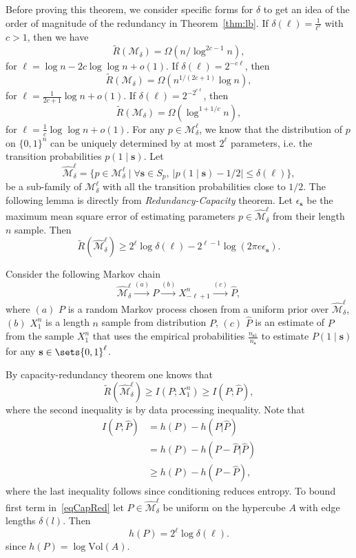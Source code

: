 \documentclass[conference,a4paper]{article}
\newcommand{\s}{\textbf{s}}
\newcommand{\M}{\mathcal{M}}
\newcommand{\hatp}{\hat{P}}
\begin{document}
Before proving this theorem, we consider specific forms for $\delta$
to get an idea of the order of magnitude of the redundancy in Theorem~\ref{thm:lb}.
\bCorollary
If $\delta(\ell)=\frac{1}{\ell^c}$ with $c>1$, then we have
\[
\tilde{R}(\M_{\delta})=\Omega(n/\log^{2c-1}n),
\]
for $\ell=\log n-2c\log\log n+o(1)$.
If $\delta(\ell)=2^{-c\ell}$, then
\[
\tilde{R}(\M_{\delta})=\Omega(n^{1/(2c+1)}\log n),
\]
for $\ell=\frac{1}{2c+1}\log n+o(1)$. 
If $\delta(\ell)=2^{-2^{c\ell}}$, then
\[
\tilde{R}(\M_{\delta})=\Omega(\log^{1+1/c}n),
\]for $\ell = \frac{1}{c}\log \log n+o(1)$.
\eCorollary
For any $p\in \M_{\delta}^{\ell}$, we know that the distribution of $p$ on $\{0,1\}^n$ can be uniquely determined by at most $2^{\ell}$ parameters, i.e. the transition probabilities $p(1\mid \s)$. Let
$$\hat{\M}_{\delta}^{\ell}=\{p\in \M_{\delta}^{\ell}\mid \forall \s\in S_p, ~|p(1\mid \s)-1/2|\le \delta(\ell)\},$$be a sub-family of $\M_{\delta}^{\ell}$ with all the transition probabilities close to $1/2$. The following lemma is directly from \emph{Redundancy-Capacity} theorem\cite{csiszar2004information}.
\bLemma
\label{firstLem}
Let $\epsilon_\s$ be the maximum mean square error of estimating parameters $p\in\hat{\M}^{\ell}_{\delta}$ from their length $n$ sample. Then
\begin{equation}
\tilde{R}(\hat{\M}^{\ell}_{\delta})\ge2^{\ell}\log \delta(\ell) - 2^{\ell-1}\log \left(2\pi e\epsilon_\s\right).
\end{equation}
\Proof

Consider the following Markov chain
\[
\hat{\M}_{\delta}^{\ell}\overset{(a)}{\rightarrow} P \overset{(b)}{\rightarrow} X_{-\ell+1}^n\overset{(c)}{\rightarrow} \hatp,
\]
where $(a)$ $P$ is a random Markov process chosen from a uniform prior
over $\hat{\M}_{\delta}^{\ell}$, $(b)$ $X_1^n$ is a length $n$ sample
from distribution $P$, $(c)$ $\hatp$ is an estimate of $P$ from the
sample $X_1^n$ that uses the empirical probabilities
$\frac{n_{\s1}}{n_{\s}}$ to estimate $P(1\mid \s)$ for any
$\s\in\sets{0,1}^\ell$. 

 By capacity-redundancy theorem one knows that
$$\tilde{R}(\hat{\M}_{\delta}^{\ell})\ge I(P;X_1^n)\ge I(P;\hatp),$$where the second inequality is by data processing inequality. Note that
\begin{align}
\label{eqCapRed}
I(P;\hatp)&=h(P)-h(P|\hatp)\nonumber\\
&=h(P)-h(P-\hatp|\hatp)\nonumber\\
&\ge h(P)-h(P-\hatp),
\end{align}
where the last inequality follows since conditioning reduces entropy. 
To bound first term in~\eqref{eqCapRed} let $P\in\hat{\M}_{\delta}^{\ell}$ be uniform on the hypercube $A$ with edge lengths $\delta(l)$. Then
\label{enterlower}
\[
h(P)= 2^\ell\log\delta(\ell).
\]
since $h(P)=\log \text{Vol}(A)$. 
\end{document}
